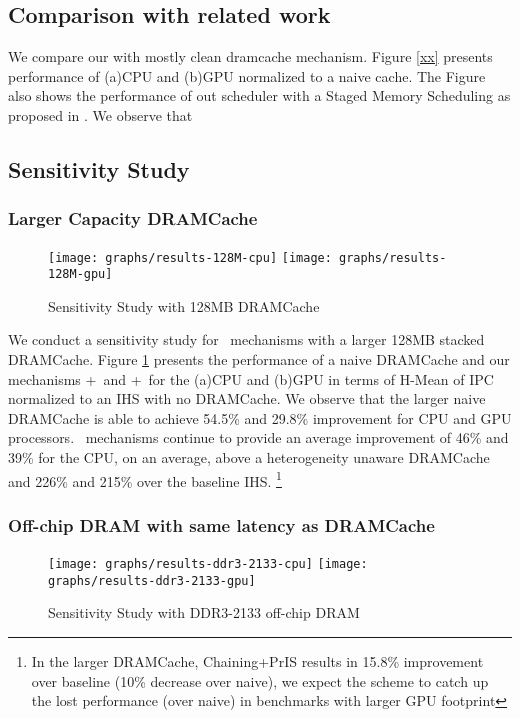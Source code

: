 \subsection{Comparison with related work}
We compare our \bypassname with mostly clean dramcache \cite{mostly-clean} mechanism. Figure \ref{xx} presents performance of (a)CPU and (b)GPU normalized to a naive cache. The Figure also shows the performance of out \prioname scheduler with a Staged Memory Scheduling as proposed in \cite{sms}. We observe that 

\subsection{Sensitivity Study}
\subsubsection{Larger Capacity DRAMCache}
\begin{figure}[!htb]
	\centering
	\texttt{[image: graphs/results-128M-cpu]}
	\texttt{[image: graphs/results-128M-gpu]}
	\caption{Sensitivity Study with 128MB DRAMCache}
	\label{results-128m}
\end{figure}
We conduct a sensitivity study for \cachename\ mechanisms with a larger 128MB stacked DRAMCache. Figure \ref{results-128m} presents the performance of a naive DRAMCache and our mechanisms \bypassname+\prioname\ and \chaining+\prioname\ for the (a)CPU and (b)GPU in terms of H-Mean of IPC normalized to an IHS with no DRAMCache. We observe that the larger naive DRAMCache is able to achieve 54.5\% and 29.8\% improvement for CPU and GPU processors. \cachename\ mechanisms continue to provide an average improvement of 46\% and 39\% for the CPU, on an average, above a heterogeneity unaware DRAMCache and 226\% and 215\% over the baseline IHS. 
\footnote{In the larger DRAMCache, Chaining+PrIS results in 15.8\% improvement over baseline (10\% decrease over naive), we
expect the scheme to catch up the lost performance (over naive) in benchmarks with larger GPU footprint}


\subsubsection{Off-chip DRAM with same latency as DRAMCache}

\begin{figure}[!htb]
	\centering
	\texttt{[image: graphs/results-ddr3-2133-cpu]}
	\texttt{[image: graphs/results-ddr3-2133-gpu]}
	\caption{Sensitivity Study with DDR3-2133 off-chip DRAM}
	\label{results-2xbw}
\end{figure}

